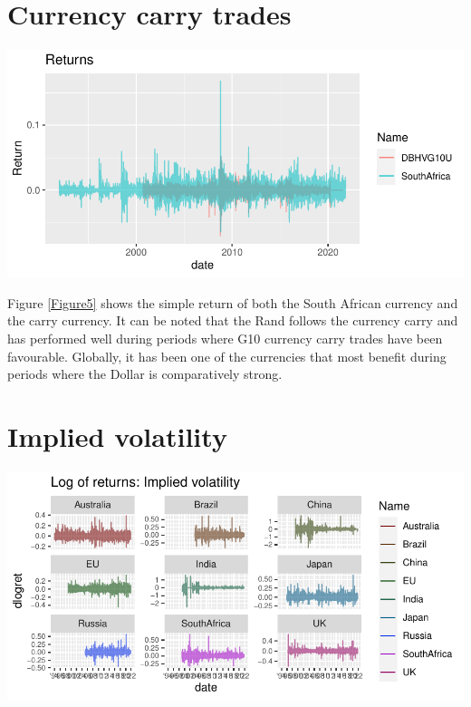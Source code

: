 \documentclass[11pt,preprint, authoryear]{elsarticle}
\let\origfigure\figure
\let\endorigfigure\endfigure
\renewenvironment{figure}[1][2] {
    \expandafter\origfigure\expandafter[H]
} {
    \endorigfigure
}
\numberwithin{equation}{section}
\numberwithin{figure}{section}
\numberwithin{table}{section}
\begin{document}
\hypertarget{currency-carry-trades}{%
\section{\texorpdfstring{Currency carry trades
\label{carry}}{Currency carry trades }}\label{currency-carry-trades}}

\begin{figure}[H]

{\centering \includegraphics{Question5_files/figure-latex/Figure5-1} 

}

\caption{Caption Here \label{Figure5}}\label{fig:Figure5}
\end{figure}

Figure \ref{Figure5} shows the simple return of both the South African
currency and the carry currency. It can be noted that the Rand follows
the currency carry and has performed well during periods where G10
currency carry trades have been favourable. Globally, it has been one of
the currencies that most benefit during periods where the Dollar is
comparatively strong.

\hypertarget{implied-volatility}{%
\section{\texorpdfstring{Implied volatility
\label{IV}}{Implied volatility }}\label{implied-volatility}}

\begin{figure}[H]

{\centering \includegraphics{Question5_files/figure-latex/Figure6-1} 

}

\caption{Caption Here \label{Figure6}}\label{fig:Figure6}
\end{figure}
\end{document}
